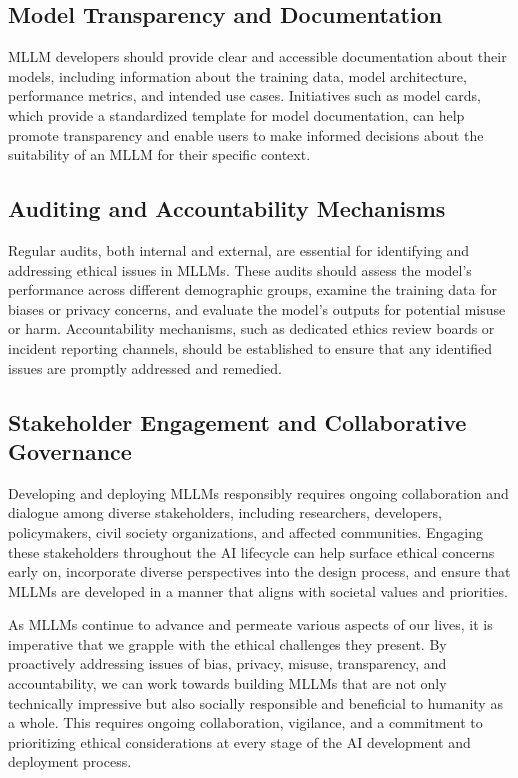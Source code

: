 \subsection{Model Transparency and Documentation}

MLLM developers should provide clear and accessible documentation about their models, including information about the training data, model architecture, performance metrics, and intended use cases. Initiatives such as model cards, which provide a standardized template for model documentation, can help promote transparency and enable users to make informed decisions about the suitability of an MLLM for their specific context.

\subsection{Auditing and Accountability Mechanisms}

Regular audits, both internal and external, are essential for identifying and addressing ethical issues in MLLMs. These audits should assess the model's performance across different demographic groups, examine the training data for biases or privacy concerns, and evaluate the model's outputs for potential misuse or harm. Accountability mechanisms, such as dedicated ethics review boards or incident reporting channels, should be established to ensure that any identified issues are promptly addressed and remedied.

\subsection{Stakeholder Engagement and Collaborative Governance}

Developing and deploying MLLMs responsibly requires ongoing collaboration and dialogue among diverse stakeholders, including researchers, developers, policymakers, civil society organizations, and affected communities. Engaging these stakeholders throughout the AI lifecycle can help surface ethical concerns early on, incorporate diverse perspectives into the design process, and ensure that MLLMs are developed in a manner that aligns with societal values and priorities.

\vspace{0.5cm}

As MLLMs continue to advance and permeate various aspects of our lives, it is imperative that we grapple with the ethical challenges they present. By proactively addressing issues of bias, privacy, misuse, transparency, and accountability, we can work towards building MLLMs that are not only technically impressive but also socially responsible and beneficial to humanity as a whole. This requires ongoing collaboration, vigilance, and a commitment to prioritizing ethical considerations at every stage of the AI development and deployment process.
